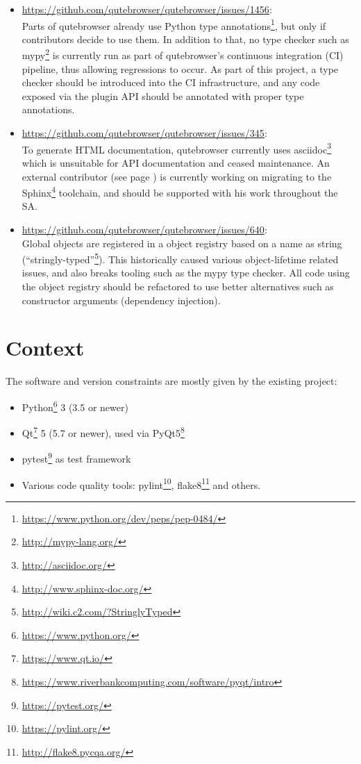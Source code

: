 \documentclass[a4paper,parskip=full]{scrreprt}
\begin{document}
\begin{itemize}
  \item \url{https://github.com/qutebrowser/qutebrowser/issues/1456}: \\ Parts of qutebrowser already use Python type
    annotations\footnote{\url{https://www.python.org/dev/peps/pep-0484/}}, but
    only if contributors decide to use them. In addition to that, no type
    checker such as mypy\footnote{\url{http://mypy-lang.org/}} is currently run
    as part of qutebrowser's continuous integration (CI) pipeline, thus allowing
    regressions to occur. As part of this project, a type checker should be
    introduced into the CI infrastructure, and any code exposed via the plugin
    API should be annotated with proper type annotations.
  \item \url{https://github.com/qutebrowser/qutebrowser/issues/345}: \\
    To generate HTML documentation, qutebrowser currently uses
    asciidoc\footnote{\url{http://asciidoc.org/}} which is unsuitable for API
    documentation and ceased maintenance. An external contributor (see page
    \pageref{fiete}) is currently working on migrating to the
    Sphinx\footnote{\url{http://www.sphinx-doc.org/}} toolchain, and should be
    supported with his work throughout the SA.
  \item \url{https://github.com/qutebrowser/qutebrowser/issues/640}: \\
    Global objects are registered in a object registry based on a name as
    string (``stringly-typed''\footnote{\url{http://wiki.c2.com/?StringlyTyped}}).
    This historically caused various object-lifetime related issues, and also
breaks tooling such as the mypy type checker. All code using the object registry
should be refactored to use better alternatives such as constructor arguments
(dependency injection).
\end{itemize}

\section{Context}

The software and version constraints are mostly given by the existing project:

\begin{itemize}
  \item Python\footnote{\url{https://www.python.org/}} 3 (3.5 or newer)
  \item Qt\footnote{\url{https://www.qt.io/}} 5 (5.7 or newer), used via PyQt5\footnote{\url{https://www.riverbankcomputing.com/software/pyqt/intro}}
  \item pytest\footnote{\url{https://pytest.org/}} as test framework
  \item Various code quality tools: pylint\footnote{\url{https://pylint.org/}},
    flake8\footnote{\url{http://flake8.pycqa.org/}} and others.
\end{itemize}
\end{document}
